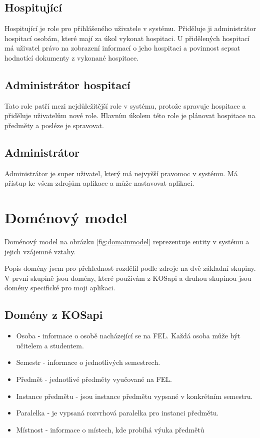 \subsection{Hospitující}
Hospitující je role pro přihlášeného uživatele v systému. Přiděluje ji administrátor hospitací osobám, které mají za úkol vykonat hospitaci. U přidělených hospitací má uživatel právo na zobrazení informací o jeho hospitaci a povinnost sepsat hodnotící dokumenty z vykonané hospitace.

\subsection{Administrátor hospitací}
Tato role patří mezi nejdůležitější role v systému, protože spravuje hospitace a přiděluje uživatelům nové role. Hlavním úkolem této role je plánovat hospitace na předměty a posléze je spravovat.   

\subsection{Administrátor}
Administrátor je super uživatel, který má nejvyšší pravomoc v systému. Má přístup ke všem zdrojům aplikace a může nastavovat aplikaci.

\section{Doménový model}
Doménový model na obrázku \ref{fig:domainmodel} reprezentuje entity v systému a jejich vzájemné vztahy. 

Popis domény jsem pro přehlednost rozdělil podle zdroje na dvě základní skupiny. V první skupině jsou domény, které používám z KOSapi a druhou skupinou jsou domény specifické pro moji aplikaci. 

\subsection{Domény z KOSapi}
\begin{itemize}
\item Osoba - informace o osobě nacházející se na FEL. Každá osoba může být učitelem a studentem.
\item Semestr - informace o jednotlivých semestrech. 
\item Předmět - jednotlivé předměty vyučované na FEL.
\item Instance předmětu - jsou instance předmětu vypsané v konkrétním semestru.
\item Paralelka - je vypsaná rozvrhová paralelka pro instanci předmětu.
\item Místnost - informace o místech, kde probíhá výuka předmětů
\end{itemize}

